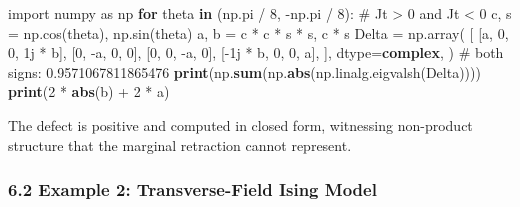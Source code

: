 \documentclass[
  11pt,
]{article}
\newenvironment{Shaded}{\begin{snugshade}}{\end{snugshade}}
\newcommand{\BuiltInTok}[1]{\textcolor[rgb]{0.39,0.29,0.61}{\textbf{#1}}}
\newcommand{\CommentTok}[1]{\textcolor[rgb]{0.54,0.53,0.53}{#1}}
\newcommand{\ControlFlowTok}[1]{\textcolor[rgb]{0.12,0.11,0.11}{\textbf{#1}}}
\newcommand{\DecValTok}[1]{\textcolor[rgb]{0.69,0.50,0.00}{#1}}
\newcommand{\ImportTok}[1]{\textcolor[rgb]{1.00,0.33,0.00}{#1}}
\newcommand{\KeywordTok}[1]{\textcolor[rgb]{0.12,0.11,0.11}{\textbf{#1}}}
\newcommand{\NormalTok}[1]{\textcolor[rgb]{0.12,0.11,0.11}{#1}}
\newcommand{\OperatorTok}[1]{\textcolor[rgb]{0.12,0.11,0.11}{#1}}
\newcommand{\OtherTok}[1]{\textcolor[rgb]{0.00,0.43,0.16}{#1}}
\begin{document}
\begin{Shaded}
\begin{Highlighting}[]
\ImportTok{import}\NormalTok{ numpy }\ImportTok{as}\NormalTok{ np}
\ControlFlowTok{for}\NormalTok{ theta }\KeywordTok{in}\NormalTok{ (np.pi }\OperatorTok{/} \DecValTok{8}\NormalTok{, }\OperatorTok{{-}}\NormalTok{np.pi }\OperatorTok{/} \DecValTok{8}\NormalTok{):  }\CommentTok{\# Jt \textgreater{} 0 and Jt \textless{} 0}
\NormalTok{    c, s }\OperatorTok{=}\NormalTok{ np.cos(theta), np.sin(theta)}
\NormalTok{    a, b }\OperatorTok{=}\NormalTok{ c }\OperatorTok{*}\NormalTok{ c }\OperatorTok{*}\NormalTok{ s }\OperatorTok{*}\NormalTok{ s, c }\OperatorTok{*}\NormalTok{ s}
\NormalTok{    Delta }\OperatorTok{=}\NormalTok{ np.array(}
\NormalTok{        [}
\NormalTok{            [a, }\DecValTok{0}\NormalTok{, }\DecValTok{0}\NormalTok{, }\OtherTok{1j} \OperatorTok{*}\NormalTok{ b],}
\NormalTok{            [}\DecValTok{0}\NormalTok{, }\OperatorTok{{-}}\NormalTok{a, }\DecValTok{0}\NormalTok{, }\DecValTok{0}\NormalTok{],}
\NormalTok{            [}\DecValTok{0}\NormalTok{, }\DecValTok{0}\NormalTok{, }\OperatorTok{{-}}\NormalTok{a, }\DecValTok{0}\NormalTok{],}
\NormalTok{            [}\OperatorTok{{-}}\OtherTok{1j} \OperatorTok{*}\NormalTok{ b, }\DecValTok{0}\NormalTok{, }\DecValTok{0}\NormalTok{, a],}
\NormalTok{        ],}
\NormalTok{        dtype}\OperatorTok{=}\BuiltInTok{complex}\NormalTok{,}
\NormalTok{    )}
    \CommentTok{\# both signs: 0.9571067811865476}
    \BuiltInTok{print}\NormalTok{(np.}\BuiltInTok{sum}\NormalTok{(np.}\BuiltInTok{abs}\NormalTok{(np.linalg.eigvalsh(Delta))))}
    \BuiltInTok{print}\NormalTok{(}\DecValTok{2} \OperatorTok{*} \BuiltInTok{abs}\NormalTok{(b) }\OperatorTok{+} \DecValTok{2} \OperatorTok{*}\NormalTok{ a)}
\end{Highlighting}
\end{Shaded}

The defect is positive and computed in closed form, witnessing non-product structure that the marginal retraction cannot represent.

\subsubsection{6.2 Example 2: Transverse-Field Ising Model}\label{example-2-transverse-field-ising-model}
\end{document}

